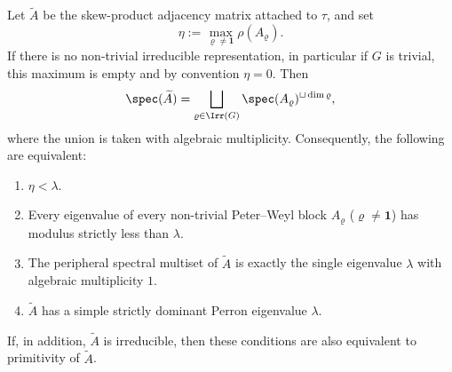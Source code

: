 \begin{lemma}
  \label{lem:twisted-gap-skew-product-peripheral}
  Let \(\widetilde A\) be the skew-product adjacency matrix attached to
  \(\tau\), and set
  \[
    \eta:=\max_{\varrho\neq\mathbf 1}\rho(A_\varrho).
  \]
  If there is no non-trivial irreducible representation, in particular
  if \(G\) is trivial, this maximum is empty and by convention
  \(\eta=0\).
  Then
  \[
    \spec(\widetilde A)
    =
    \bigsqcup_{\varrho\in\Irr(G)}
      \spec(A_\varrho)^{\sqcup \dim\varrho},
  \]
  where the union is taken with algebraic multiplicity. Consequently,
  the following are equivalent:
  \begin{enumerate}[label=\rm(\roman*)]
  \item \(\eta<\lambda\).
  \item Every eigenvalue of every non-trivial Peter--Weyl block
    \(A_\varrho\) (\(\varrho\neq\mathbf 1\)) has modulus strictly less
    than \(\lambda\).
  \item The peripheral spectral multiset of \(\widetilde A\) is exactly
    the single eigenvalue \(\lambda\) with algebraic multiplicity \(1\).
  \item \(\widetilde A\) has a simple strictly dominant Perron
    eigenvalue \(\lambda\).
  \end{enumerate}
  If, in addition, \(\widetilde A\) is irreducible, then these
  conditions are also equivalent to primitivity of \(\widetilde A\).
\end{lemma}

